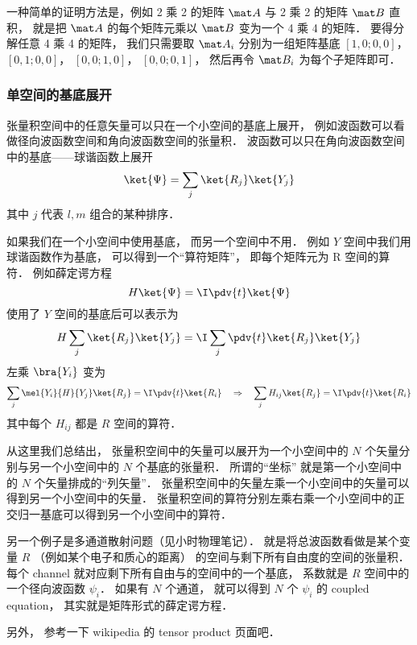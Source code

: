 一种简单的证明方法是，例如 2 乘 2 的矩阵 $\mat A$ 与 2 乘 2 的矩阵 $\mat B$ 直积， 就是把 $\mat A$ 的每个矩阵元乘以 $\mat B$ 变为一个 4 乘 4 的矩阵． 要得分解任意 4 乘 4 的矩阵， 我们只需要取 $\mat A_i$ 分别为一组矩阵基底 $[1, 0; 0, 0]$， $[0, 1; 0, 0]$， $[0, 0; 1, 0]$， $[0, 0; 0, 1]$， 然后再令 $\mat B_i$ 为每个子矩阵即可．

\subsubsection{单空间的基底展开}
张量积空间中的任意矢量可以只在一个小空间的基底上展开， 例如波函数可以看做径向波函数空间和角向波函数空间的张量积． 波函数可以只在角向波函数空间中的基底——球谐函数上展开
\begin{equation}
\ket{\Psi} = \sum_j \ket{R_j}\ket{Y_j}
\end{equation}
其中 $j$ 代表 $l, m$ 组合的某种排序．

如果我们在一个小空间中使用基底， 而另一个空间中不用． 例如 $Y$ 空间中我们用球谐函数作为基底， 可以得到一个“算符矩阵”， 即每个矩阵元为 R 空间的算符． 例如薛定谔方程
\begin{equation}
H \ket{\Psi} = \I \pdv{t}  \ket{\Psi}
\end{equation}
使用了 $Y$ 空间的基底后可以表示为
\begin{equation}
H \sum_j \ket{R_j}\ket{Y_j} =  \I  \sum_j\pdv{t}  \ket{R_j}\ket{Y_j}
\end{equation}
左乘 $\bra{Y_i}$ 变为
\begin{equation}
\sum_j \mel{Y_i}{H}{Y_j} \ket{R_j} =  \I  \pdv{t}  \ket{R_i}
\quad\Rightarrow\quad
\sum_j H_{ij} \ket{R_j} =  \I  \pdv{t}  \ket{R_i}
\end{equation}
其中每个 $H_{ij}$ 都是 $R$ 空间的算符．

从这里我们总结出， 张量积空间中的矢量可以展开为一个小空间中的 $N$ 个矢量分别与另一个小空间中的 $N$ 个基底的张量积． 所谓的“坐标” 就是第一个小空间中的 $N$ 个矢量排成的“列矢量”． 张量积空间中的矢量左乘一个小空间中的矢量可以得到另一个小空间中的矢量． 张量积空间的算符分别左乘右乘一个小空间中的正交归一基底可以得到另一个小空间中的算符．

另一个例子是多通道散射问题（见小时物理笔记）． 就是将总波函数看做是某个变量 $R$ （例如某个电子和质心的距离） 的空间与剩下所有自由度的空间的张量积． 每个 channel 就对应剩下所有自由与的空间中的一个基底， 系数就是 $R$ 空间中的一个径向波函数 $\psi_i$． 如果有 $N$ 个通道， 就可以得到 $N$ 个 $\psi_i$ 的 coupled equation， 其实就是矩阵形式的薛定谔方程．

另外， 参考一下 wikipedia 的 tensor product 页面吧．

